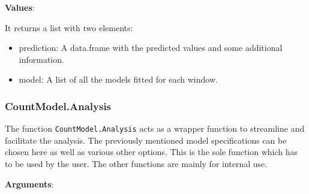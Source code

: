 \textbf{Values}:

It returns a list with two elements:

\begin{itemize}
	\item prediction: A data.frame with the predicted values and some additional information.
	\item model: A list of all the models fitted for each window. 
\end{itemize}


\subsubsection{CountModel.Analysis}
\label{sec:CountModel.Analysis}


The function \texttt{CountModel.Analysis} acts as a wrapper function to streamline and facilitate the analysis. The previously mentioned model specifications can be chosen here as well as various other options. This is the sole function which has to be used by the user. The other functions are mainly for internal use.

\textbf{Arguments}:

